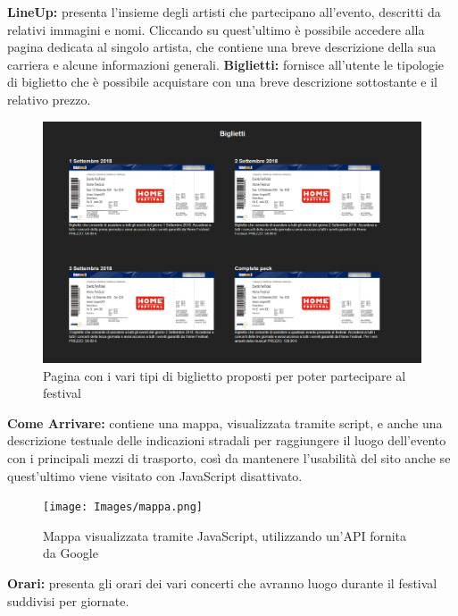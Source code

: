 \documentclass[10pt, a4paper]{article}
\begin{document}
\newline \textbf{LineUp: }presenta l'insieme degli artisti che partecipano all'evento, descritti da relativi immagini e nomi. Cliccando su quest'ultimo è possibile accedere alla pagina dedicata al singolo artista, che contiene una breve descrizione della sua carriera e alcune informazioni generali.
\newline \textbf{Biglietti: }fornisce all'utente le tipologie di biglietto che è possibile acquistare con una breve descrizione sottostante e il relativo prezzo.
\begin{figure}[h!]
  \centering
  \includegraphics[width=1\textwidth]{Images/biglietti.png}
  \caption{Pagina con i vari tipi di biglietto proposti per poter partecipare al festival}
  \label{fig:biglietti}
\end{figure}
\newline \textbf{Come Arrivare: }contiene una mappa, visualizzata tramite script, e anche una descrizione testuale delle indicazioni stradali per raggiungere il luogo dell'evento con i principali mezzi di trasporto, così da mantenere l'usabilità del sito anche se quest'ultimo viene visitato con JavaScript disattivato.
\begin{figure}[h!]
  \centering
  \texttt{[image: Images/mappa.png]}
  \caption{Mappa visualizzata tramite JavaScript, utilizzando un'API fornita da Google}
  \label{fig:mappa}
\end{figure}
\newline \textbf{Orari: }presenta gli orari dei vari concerti che avranno luogo durante il festival suddivisi per giornate.
\end{document}

